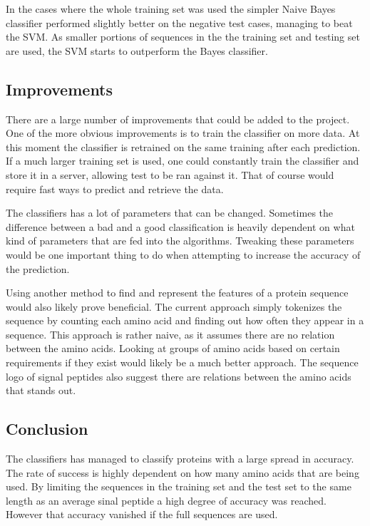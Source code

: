 \documentclass[10pt,letterpaper]{article}
\begin{document}
In the cases where the whole training set was used the simpler Naive Bayes classifier performed slightly better on the negative test cases, managing to beat the SVM. As smaller portions of sequences in the the training set and testing set are used, the SVM starts to outperform the Bayes classifier. 


\subsection*{Improvements}
There are a large number of improvements that could be added to the project. One of the more obvious improvements is to train the classifier on more data. At this moment the classifier is retrained on the same training after each prediction. If a much larger training set is used, one could constantly train the classifier and store it in a server, allowing test to be ran against it. That of course would require fast ways to predict and retrieve the data.

The classifiers has a lot of parameters that can be changed. Sometimes the difference between a bad and a good classification is heavily dependent on what kind of parameters that are fed into the algorithms. Tweaking these parameters would be one important thing to do when attempting to increase the accuracy of the prediction. 

Using another method to find and represent the features of a protein sequence would also likely prove beneficial. The current approach simply tokenizes the sequence by counting each amino acid and finding out how often they appear in a sequence. This approach is rather naive, as it assumes there are no relation between the amino acids. Looking at groups of amino acids based on certain requirements if they exist would likely be a much better approach. The sequence logo of signal peptides also suggest there are relations between the amino acids that stands out. 

\subsection*{Conclusion}
The classifiers has managed to classify proteins with a large spread in accuracy. The rate of success is highly dependent on how many amino acids that are being used. By limiting the sequences in the training set and the test set to the same length as an average sinal peptide a high degree of accuracy was reached. However that accuracy vanished if the full sequences are used. 
\end{document}

